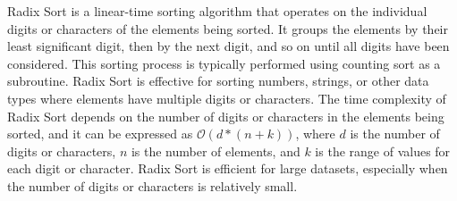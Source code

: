 Radix Sort is a linear-time sorting algorithm that operates on the individual digits or characters of the elements being sorted. It groups the elements by their least significant digit, then by the next digit, and so on until all digits have been considered. This sorting process is typically performed using counting sort as a subroutine. Radix Sort
is effective for sorting numbers, strings, or other data types where elements have multiple digits or characters. The time complexity of Radix Sort depends on the number of digits or characters in the elements being sorted, and it can be expressed as 
$\mathcal{O}(d*(n+k))$, where $d$ is the number of digits or characters, $n$ is the number of elements, and $k$ is the range of values for each digit or character. Radix Sort is efficient for large datasets, especially when the number of digits or characters is relatively small.

